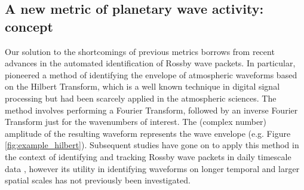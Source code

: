 \subsection{A new metric of planetary wave activity: concept}

Our solution to the shortcomings of previous metrics borrows from recent advances in the automated identification of Rossby wave packets. In particular, \citet{Zimin2003} pioneered a method of identifying the envelope of atmospheric waveforms based on the Hilbert Transform, which is a well known technique in digital signal processing but had been scarcely applied in the atmospheric sciences. The method involves performing a Fourier Transform, followed by an inverse Fourier Transform just for the wavenumbers of interest. The (complex number) amplitude of the resulting waveform represents the wave envelope (e.g. Figure \ref{fig:example_hilbert}). Subsequent studies have gone on to apply this method in the context of identifying and tracking Rossby wave packets in daily timescale data \citep{Glatt2014,Souders2014a}, however its utility in identifying waveforms on longer temporal and larger spatial scales has not previously been investigated.